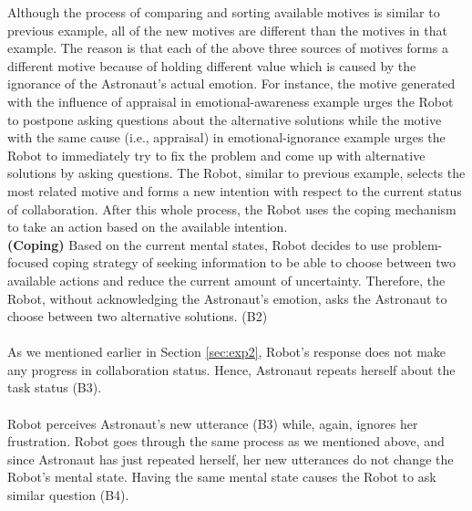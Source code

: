 Although the process of comparing and sorting available motives is similar to
previous example, all of the new motives are different than the motives in that
example. The reason is that each of the above three sources of motives forms a
different motive because of holding different value which is caused by the
ignorance of the Astronaut's actual emotion. For instance, the motive generated
with the influence of appraisal in emotional-awareness example urges the Robot
to postpone asking questions about the alternative solutions while the motive
with the same cause (i.e., appraisal) in emotional-ignorance example urges the
Robot to immediately try to fix the problem and come up with alternative
solutions by asking questions. The Robot, similar to previous example, selects
the most related motive and forms a new intention with respect to the current
status of collaboration. After this whole process, the Robot uses the coping
mechanism to take an action based on the available intention.\\

\noindent\textbf{(Coping)} Based on the current mental states, Robot decides to
use problem-focused coping strategy of seeking information to be able to choose
between two available actions and reduce the current amount of uncertainty.
Therefore, the Robot, without acknowledging the Astronaut's emotion, asks the
Astronaut to choose between two alternative solutions. (B2)\\

\noindent{}\\

As we mentioned earlier in Section \ref{sec:exp2}, Robot's response does not
make any progress in collaboration status. Hence, Astronaut repeats herself
about the task status (B3).\\

\noindent{}\\

Robot perceives Astronaut's new utterance (B3) while, again, ignores her
frustration. Robot goes through the same process as we mentioned above, and
since Astronaut has just repeated herself, her new utterances do not change the
Robot's mental state. Having the same mental state causes the Robot to ask
similar question (B4).\\


